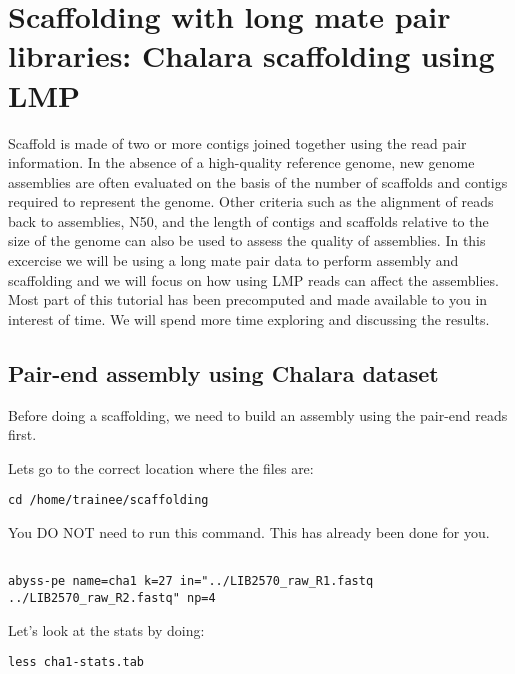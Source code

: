 \newpage

\section{Scaffolding with long mate pair libraries: Chalara scaffolding using LMP}

\begin{information}
Scaffold is made of two or more contigs joined together using the read pair information. In the absence of a high-quality reference genome, new genome assemblies are often evaluated on the basis of the number of scaffolds and contigs required to represent the genome. Other criteria such as the alignment of reads back to assemblies, N50,  and the length of contigs and scaffolds relative to the size of the genome can also be used to assess the quality of assemblies.
In this excercise we will be using a long mate pair data to perform assembly and scaffolding and we will focus on how using LMP reads can affect the assemblies.
Most part of this tutorial has been precomputed and made available to you in interest of time. We will spend more time exploring and discussing the results.
\end{information}
\subsection{Pair-end assembly using Chalara dataset}
Before doing a scaffolding, we need to build an assembly using the pair-end reads first.

\begin{steps}
Lets go to the correct location where the files are:
\begin{lstlisting}
cd /home/trainee/scaffolding
\end{lstlisting}
\end{steps}

\begin{warning}
You DO NOT need to run this command. This has already been done for you.
\begin{lstlisting}

abyss-pe name=cha1 k=27 in="../LIB2570_raw_R1.fastq ../LIB2570_raw_R2.fastq" np=4

\end{lstlisting}
\end{warning}
\begin{steps}
Let's look at the stats by doing:
\begin{lstlisting}
less cha1-stats.tab
\end{lstlisting}
\end{steps}


